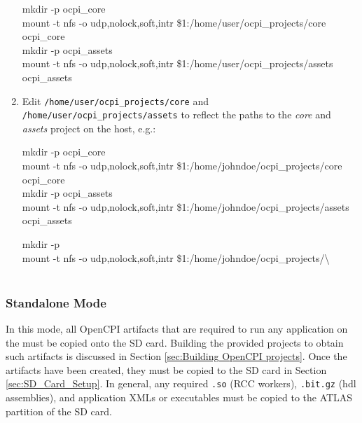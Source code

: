 \begin{flushleft}
\begin{enumerate}
\begin{texttt}
mkdir -p \mountPoint ocpi\_core \\
mount -t nfs -o udp,nolock,soft,intr \$1:/home/user/ocpi\_projects/core \mountPoint ocpi\_core \\
mkdir -p \mountPoint ocpi\_assets \\
mount -t nfs -o udp,nolock,soft,intr \$1:/home/user/ocpi\_projects/assets \mountPoint ocpi\_assets\\
\end{texttt}
 \item Edit \texttt{/home/user/ocpi\_projects/core} and \texttt{/home/user/ocpi\_projects/assets} to reflect the paths to the \textit{core} and \textit{assets} project on the host, e.g.:\\ \medskip
\begin{texttt}
mkdir -p \mountPoint ocpi\_core \\
mount -t nfs -o udp,nolock,soft,intr \$1:/home/johndoe/ocpi\_projects/core \mountPoint ocpi\_core\\
mkdir -p \mountPoint ocpi\_assets \\
mount -t nfs -o udp,nolock,soft,intr \$1:/home/johndoe/ocpi\_projects/assets \mountPoint ocpi\_assets\\
\end{texttt}
\ifx\bspProj\undefined
\else 
\begin{texttt}
mkdir -p \mountPoint \bspProj \\
mount -t nfs -o udp,nolock,soft,intr \$1:/home/johndoe/ocpi\_projects/\bspProj \space \textbackslash \\
\mountPoint \bspProj \\
\end{texttt}
\fi
\end{enumerate}

\subsubsection{Standalone Mode}
In this mode, all OpenCPI artifacts that are required to run any application on the \radioName \space must be copied onto the SD card.  Building the provided projects to obtain such artifacts is discussed in Section \ref{sec:Building OpenCPI projects}. Once the artifacts have been created, they must be copied to the SD card in Section \ref{sec:SD_Card_Setup}. In general, any required \texttt{.so} (RCC workers), \texttt{.bit.gz} (hdl assemblies), and application XMLs or executables must be copied to the ATLAS partition of the SD card. \medskip


\end{flushleft}
